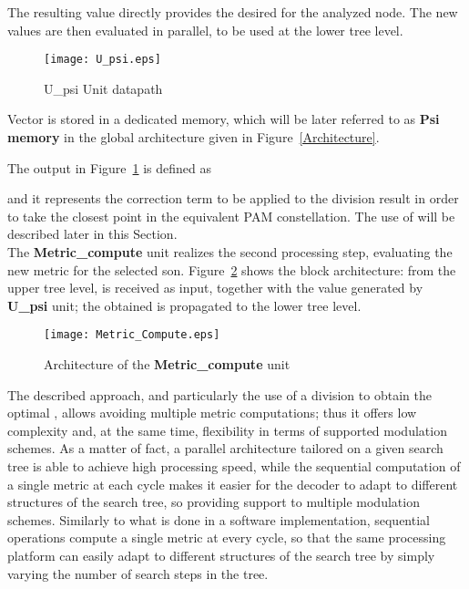 \documentclass[12pt,onecolumn,draftclsnofoot]{IEEEtran}
\begin{document}
The resulting value
directly provides the desired  for the analyzed node.
The new  values are then evaluated in parallel, to be used at the 
lower tree level. 

\begin{figure}[ht]
    \begin{center}
    \texttt{[image: U\_psi.eps]}
    \caption{U\_psi Unit datapath}
    \label{U_psi}
    \end{center}
\end{figure}
Vector  is stored in a dedicated memory, 
which will be later referred to as \textbf{Psi memory} in
the global architecture given in Figure~\ref{Architecture}. 

The  output in Figure~\ref{U_psi} is defined as

\noindent and it represents the correction term to be applied to the division result in order 
to take the closest point in the equivalent PAM constellation. The use of  will be described 
later in this Section.\\

The \textbf{Metric\_compute} unit realizes the second processing step, 
evaluating the new metric  for the selected son.
Figure~\ref{Metric_block} shows the block architecture: from the upper tree level,
 is received as input, together with the  value generated
by \textbf{U\_psi} unit; the obtained  is propagated to the lower tree level.
\begin{figure}[ht]
    \begin{center}
    \texttt{[image: Metric\_Compute.eps]}
    \caption{Architecture of the \textbf{Metric\_compute} unit}
    \label{Metric_block}
    \end{center}
\end{figure}

The described approach, and particularly the use of a division to obtain the 
optimal , allows avoiding multiple metric computations; thus it
offers low complexity and, at the same time, flexibility in terms of
supported modulation schemes.
As a matter of fact, a parallel architecture tailored on a given search tree
is able to achieve high processing speed, while
the sequential computation of a single metric at each cycle
makes it easier for the decoder to adapt to different
structures of the search tree, so providing support to multiple modulation
schemes. Similarly to what is done in a software implementation, sequential 
operations compute a single metric at every cycle, so that the same processing 
platform can easily adapt to different structures of the search tree by
simply varying the number of search steps in the tree.
\end{document}
